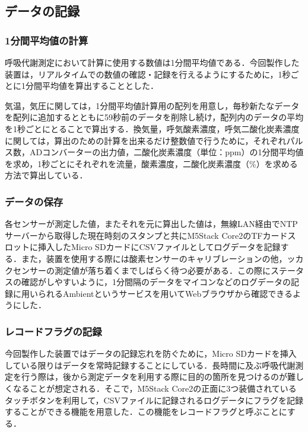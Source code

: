 \subsection{データの記録}

\subsubsection{1分間平均値の計算}

呼吸代謝測定において計算に使用する数値は1分間平均値である．今回製作した装置は，リアルタイムでの数値の確認・記録を行えるようにするために，1秒ごとに1分間平均値を算出することとした．

気温，気圧に関しては，1分間平均値計算用の配列を用意し，毎秒新たなデータを配列に追加するとともに59秒前のデータを削除し続け，配列内のデータの平均を1秒ごとにとることで算出する．換気量，呼気酸素濃度，呼気二酸化炭素濃度に関しては，算出のための計算を出来るだけ整数値で行うために，それぞれパルス数，ADコンバーターの出力値，二酸化炭素濃度（単位：ppm）の1分間平均値を求め，1秒ごとにそれぞれを流量，酸素濃度，二酸化炭素濃度（\%）を求める方法で算出している．

\subsubsection{データの保存}

各センサーが測定した値，またそれを元に算出した値は，無線LAN経由でNTPサーバーから取得した現在時刻のスタンプと共にM5Stack Core2のTFカードスロットに挿入したMicro SDカードにCSVファイルとしてログデータを記録する．また，装置を使用する際には酸素センサーのキャリブレーションの他，ッカクセンサーの測定値が落ち着くまでしばらく待つ必要がある．この際にステータスの確認がしやすいように，1分間隔のデータをマイコンなどのログデータの記録に用いられるAmbientというサービスを用いてWebブラウザから確認できるようにした．

\subsubsection{レコードフラグの記録}

今回製作した装置ではデータの記録忘れを防ぐために，Micro SDカードを挿入している限りはデータを常時記録することにしている．長時間に及ぶ呼吸代謝測定を行う際は，後から測定データを利用する際に目的の箇所を見つけるのが難しくなることが想定される．そこで，M5Stack Core2の正面に3つ装備されているタッチボタンを利用して，CSVファイルに記録されるログデータにフラグを記録することができる機能を用意した．この機能をレコードフラグと呼ぶことにする．

